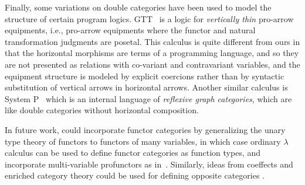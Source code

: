 \documentclass{llncs}
\begin{document}
Finally, some variations on double categories have been used to model
the structure of certain program
logics. GTT~\cite{double-cats-gradual-typing} is a logic for
\emph{vertically thin} pro-arrow equipments, i.e., pro-arrow equipments
where the functor and natural transformation judgments are posetal. This
calculus is quite different from ours in that the horizontal morphisms
are terms of a programming language, and so they are not presented as
relations with co-variant and contravariant variables, and the equipment
structure is modeled by explicit coercions rather than by syntactic
substitution of vertical arrows in horizontal arrows. Another similar
calculus is System P~\cite{dunphyreddy} which is an internal language
of \emph{reflexive graph categories}, which are like double categories
without horizontal composition.


In future work, \vett{} could incorporate functor categories by
generalizing the unary type theory of functors to functors of many
variables, in which case ordinary $\lambda$ calculus can be used to
define functor categories as function types, and incorporate
multi-variable profunctors as in~\cite{frey}.  Similarly, ideas from
coeffects and enriched category theory could be used for defining
opposite categories \cite{Shulman18,coeffect}.



\end{document}
